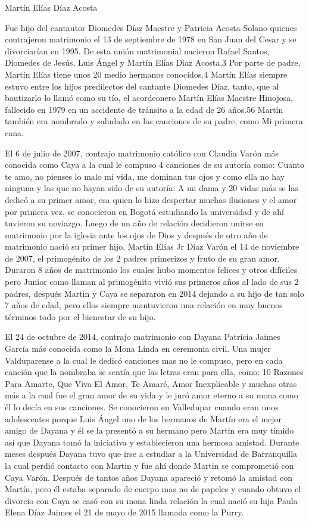 Martín Elías Díaz Acosta

Fue hijo del cantautor Diomedes Díaz Maestre y Patricia Acosta Solano quienes contrajeron matrimonio el 13 de septiembre de 1978 en San Juan del Cesar y se divorciarían en 1995. De esta unión matrimonial nacieron Rafael Santos, Diomedes de Jesús, Luis Ángel y Martín Elías Díaz Acosta.3​ Por parte de padre, Martín Elías tiene unos 20 medio hermanos conocidos.4​ Martín Elías siempre estuvo entre los hijos predilectos del cantante Diomedes Díaz, tanto, que al bautizarlo lo llamó como su tío, el acordeonero Martín Elías Maestre Hinojosa, fallecido en 1979 en un accidente de tránsito a la edad de 26 años.5​6​ Martín también era nombrado y saludado en las canciones de su padre, como Mi primera cana.

El 6 de julio de 2007, contrajo matrimonio católico con Claudia Varón más conocida como Caya a la cual le compuso 4 canciones de su autoría como: Cuanto te amo, no pienses lo malo mi vida, me dominan tus ojos y como ella no hay ninguna y las que no hayan sido de su autoría: A mi dama y 20 vidas más se las dedicó a su primer amor, esa quien lo hizo despertar muchas ilusiones y el amor por primera vez, se conocieron en Bogotá estudiando la universidad y de ahí tuvieron su noviazgo. Luego de un año de relación decidieron unirse en matrimonio por la iglesia ante los ojos de Dios y después de otro año de matrimonio nació su primer hijo, Martín Elías Jr Díaz Varón el 14 de noviembre de 2007, el primogénito de los 2 padres primerizos y fruto de su gran amor. Duraron 8 años de matrimonio los cuales hubo momentos felices y otros difíciles pero Junior como llaman al primogénito vivió sus primeros años al lado de sus 2 padres, después Martin y Caya se separaron en 2014 dejando a su hijo de tan solo 7 años de edad, pero ellos siempre mantuvieron una relación en muy buenos términos todo por el bienestar de su hijo.

El 24 de octubre de 2014, contrajo matrimonio con Dayana Patricia Jaimes García más conocida como la Mona Linda en ceremonia civil. Una mujer Valduparense a la cual le dedicó canciones mas no le compuso, pero en cada canción que la nombraba se sentía que las letras eran para ella, como: 10 Razones Para Amarte, Que Viva El Amor, Te Amaré, Amor Inexplicable y muchas otras más a la cual fue el gran amor de su vida y le juró amor eterno a su mona como él lo decía en sus canciones. Se conocieron en Valledupar cuando eran unos adolescentes porque Luis Ángel uno de los hermanos de Martín era el mejor amigo de Dayana y él se la presentó a su hermano pero Martin era muy tímido así que Dayana tomó la iniciativa y establecieron una hermosa amistad. Durante meses después Dayana tuvo que irse a estudiar a la Universidad de Barranquilla la cual perdió contacto con Martin y fue ahí donde Martin se comprometió con Caya Varón. Después de tantos años Dayana apareció y retomó la amistad con Martín, pero él estaba separado de cuerpo mas no de papeles y cuando obtuvo el divorcio con Caya se casó con su mona linda relación la cual nació su hija Paula Elena Díaz Jaimes el 21 de mayo de 2015 llamada como la Purry. 